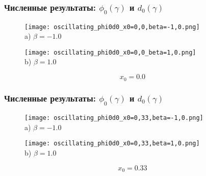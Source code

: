 \documentclass[fullscreen=true, unicode, bookmarks=false]{beamer}
\begin{document}
\begin{frame}
\frametitle{ Численные результаты: $ \phi_0(\gamma) $ и $ d_0(\gamma) $ }

\begin{figure} 
\begin{minipage}[h]{0.49\linewidth}
\begin{center}
\texttt{[image: oscillating\_phi0d0\_x0=0,0,beta=-1,0.png]} \\ {\scriptsize a) $ \beta = -1.0 $}
\end{center}
\end{minipage} 
\hfill
\begin{minipage}[h]{0.49\linewidth}
\begin{center}
\texttt{[image: oscillating\_phi0d0\_x0=0,0\_beta=1,0.png]}  \\ {\scriptsize b) $ \beta = 1.0 $}
\end{center}
\end{minipage} 
\end{figure}

$$ x_0 = 0.0 $$

\end{frame}

\begin{frame}
\frametitle{ Численные результаты: $ \phi_0(\gamma) $ и $ d_0(\gamma) $ }

\begin{figure} 
\begin{minipage}[h]{0.49\linewidth}
\begin{center}
\texttt{[image: oscillating\_phi0d0\_x0=0,33,beta=-1,0.png]} \\ {\scriptsize a) $ \beta = -1.0 $}
\end{center}
\end{minipage} 
\hfill
\begin{minipage}[h]{0.49\linewidth}
\begin{center}
\texttt{[image: oscillating\_phi0d0\_x0=0,33,beta=1,0.png]}  \\ {\scriptsize b) $ \beta = 1.0 $}
\end{center}
\end{minipage} 
\end{figure}

$$ x_0 = 0.33 $$

\end{frame}

\begin{frame}
\titlepage
\end{frame} 
\end{document}
